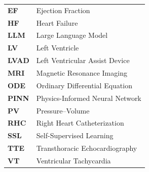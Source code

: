 \begin{tabularx}{\textwidth}{>{\bfseries}l X}
EF & Ejection Fraction \\
HF & Heart Failure \\
LLM & Large Language Model \\
LV & Left Ventricle \\
LVAD & Left Ventricular Assist Device \\
MRI & Magnetic Resonance Imaging \\
ODE & Ordinary Differential Equation \\
PINN & Physics-Informed Neural Network \\
PV & Pressure--Volume \\
RHC & Right Heart Catheterization \\
SSL & Self-Supervised Learning \\
TTE & Transthoracic Echocardiography \\
VT & Ventricular Tachycardia \\
\end{tabularx}
\renewcommand{\arraystretch}{1}
\normalsize

\clearpage
